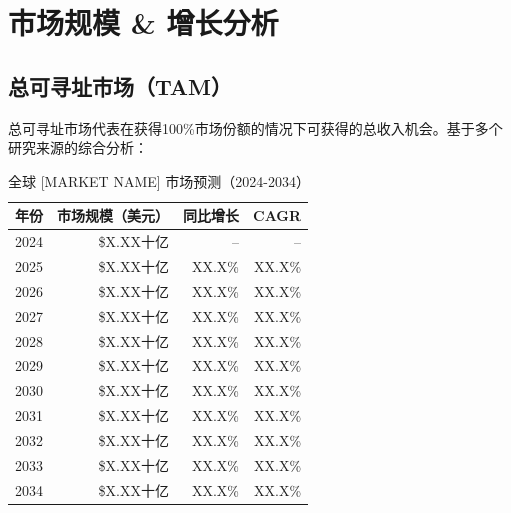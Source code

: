 \documentclass[11pt,letterpaper]{report}
\newcommand{\reporttitle}{[MARKET NAME]}
\begin{document}
{%
\chapter{市场规模 \& 增长分析}

\section{总可寻址市场（TAM）}

总可寻址市场代表在获得100\%市场份额的情况下可获得的总收入机会。基于多个研究来源的综合分析：


\begin{table}[htbp]
\centering
\caption{全球 \reporttitle{} 市场预测（2024-2034）}
\begin{tabular}{@{}lrrr@{}}
\toprule
\textbf{年份} & \textbf{市场规模（美元）} & \textbf{同比增长} & \textbf{CAGR} \\
\midrule
2024 & \$X.XX十亿 & -- & -- \\
\rowcolor{tablealt} 2025 & \$X.XX十亿 & XX.X\% & XX.X\% \\
2026 & \$X.XX十亿 & XX.X\% & XX.X\% \\
\rowcolor{tablealt} 2027 & \$X.XX十亿 & XX.X\% & XX.X\% \\
2028 & \$X.XX十亿 & XX.X\% & XX.X\% \\
\rowcolor{tablealt} 2029 & \$X.XX十亿 & XX.X\% & XX.X\% \\
2030 & \$X.XX十亿 & XX.X\% & XX.X\% \\
\rowcolor{tablealt} 2031 & \$X.XX十亿 & XX.X\% & XX.X\% \\
2032 & \$X.XX十亿 & XX.X\% & XX.X\% \\
\rowcolor{tablealt} 2033 & \$X.XX十亿 & XX.X\% & XX.X\% \\
2034 & \$X.XX十亿 & XX.X\% & XX.X\% \\
\bottomrule
\end{tabular}
\label{tab:tam_projections}
\end{table}

}
\end{document}
